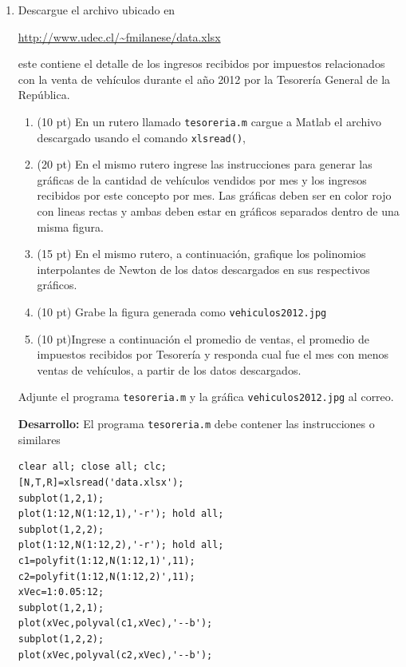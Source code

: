 \documentclass[11pt]{article}
\begin{document}
\begin{enumerate}
\item Descargue el archivo ubicado en 
\begin{center}
\url{http://www.udec.cl/~fmilanese/data.xlsx}
\end{center}
este contiene el detalle de los ingresos recibidos por impuestos relacionados con la venta de veh\'iculos durante el a\~no 2012 por la Tesorer\'ia General de la Rep\'ublica.
\begin{enumerate}
	\item (10 pt) En un rutero llamado \texttt{tesoreria.m} cargue a Matlab el archivo descargado usando el comando \texttt{xlsread()}, 
    \item (20 pt) En el mismo rutero ingrese las instrucciones para generar las gr\'aficas de la cantidad de veh\'iculos vendidos por mes y los ingresos recibidos por este concepto por mes. Las gr\'aficas deben ser en color rojo con lineas rectas y ambas deben estar en gr\'aficos separados dentro de una misma figura. 
    \item (15 pt) En el mismo rutero, a continuación, grafique los polinomios interpolantes de Newton de los datos descargados en sus respectivos gr\'aficos.
    \item (10 pt) Grabe la figura generada como \texttt{vehiculos2012.jpg}
    \item (10 pt)Ingrese a continuaci\'on el promedio de ventas, el promedio de impuestos recibidos por Tesorería y responda cual fue el mes con menos ventas de veh\'iculos, a partir de los datos descargados.

    
\end{enumerate}
Adjunte el programa \texttt{tesoreria.m} y la gr\'afica \texttt{vehiculos2012.jpg} al correo.

\newpage
\textbf{Desarrollo:}
El programa \texttt{tesoreria.m} debe contener las instrucciones o similares

\begin{minipage}{0.8\textwidth}
\begin{lstlisting}
clear all; close all; clc;
[N,T,R]=xlsread('data.xlsx');
subplot(1,2,1);
plot(1:12,N(1:12,1),'-r'); hold all;
subplot(1,2,2);
plot(1:12,N(1:12,2),'-r'); hold all; 
c1=polyfit(1:12,N(1:12,1)',11);
c2=polyfit(1:12,N(1:12,2)',11);
xVec=1:0.05:12;
subplot(1,2,1);
plot(xVec,polyval(c1,xVec),'--b');
subplot(1,2,2);
plot(xVec,polyval(c2,xVec),'--b');
\end{lstlisting}
\end{minipage}
\,


\end{enumerate}
\end{document}
